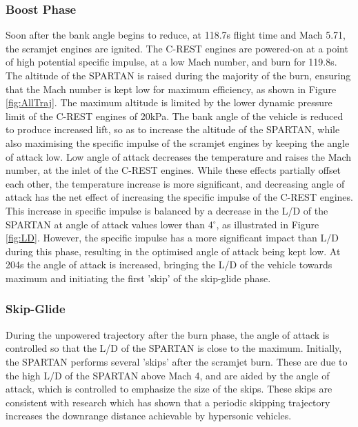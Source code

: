 \subsubsection{ Boost Phase}
Soon after the bank angle begins to reduce, at 118.7s flight time and Mach 5.71, the scramjet engines are ignited. The C-REST engines are powered-on at a point of high potential specific impulse, at a low Mach number, and burn for 119.8s. The altitude of the SPARTAN is raised during the majority of the burn, ensuring that the Mach number is kept low for maximum efficiency\cite{Preller2017}, as shown in Figure \ref{fig:AllTraj}. The maximum altitude is limited by the lower dynamic pressure limit of the C-REST engines of 20kPa. The bank angle of the vehicle is reduced to produce increased lift, so as to increase the altitude of the SPARTAN, while also maximising the specific impulse of the scramjet engines by keeping the angle of attack low. Low angle of attack decreases the temperature and raises the Mach number, at the inlet of the C-REST engines. While these effects partially offset each other\cite{Preller2017}, the temperature increase is more significant, and decreasing angle of attack has the net effect of increasing the specific impulse of the C-REST engines. This increase in specific impulse is balanced by a decrease in the L/D of the SPARTAN at angle of attack values lower than 4$^\circ$, as illustrated in Figure \ref{fig:LD}. However, the specific impulse has a more significant impact than L/D during this phase, resulting in the optimised angle of attack being kept low. At 204s the angle of attack is increased, bringing the L/D of the vehicle towards maximum and initiating the first 'skip' of the skip-glide phase.  


\subsubsection{ Skip-Glide}
During the unpowered trajectory after the burn phase, the angle of attack is controlled so that the L/D of the SPARTAN is close to the maximum. Initially, the SPARTAN performs several 'skips' after the scramjet burn. These are due to the high L/D of the SPARTAN above Mach 4, and are aided by the angle of attack, which is controlled to emphasize the size of the skips. These skips are consistent with research which has shown that a periodic skipping trajectory increases the downrange distance achievable by hypersonic vehicles\cite{Eggers1957,Kanda2007}. 


